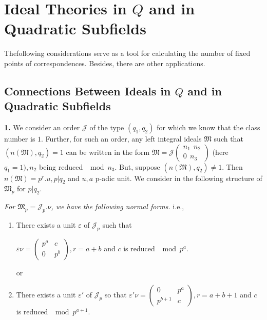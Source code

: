 \chapter{Ideal Theories in \texorpdfstring{$Q$}{Q} and in Quadratic Subfields}\label{chap4}%

The\pageoriginale following considerations serve as a tool for calculating the
number of fixed points of correspondences. Besides, there are other
applications. 
\setcounter{section}{8}
\section[Connections Between Ideals in...]{Connections Between Ideals in \texorpdfstring{$Q$}{Q} and in Quad\-ratic
  Subfields}\label{chap4:sec9}%

\textbf{1.} We consider an order $\mathcal{J}$ of the type $(q_1, q_2)$ for
which we know that the class number is $1$. Further, for such an
order, any left integral ideals $\mathfrak{M}$ such that
$(n(\mathfrak{M}), q_2) = 1$ can be written in the form $\mathfrak{M}
= \mathcal{J} \begin{pmatrix} n_1~ ~n_2 \\ 0 ~~ n_3 \end{pmatrix}$
(here $q_1 = 1), n_2$ being reduced $\mod n_3$. But, suppose
$(n(\mathfrak{M}), q_2) \neq 1$. Then $n (\mathfrak{M}) = p^r. u, p |
q_2$ and $u, a$ p-adic unit. We consider in the following structure of
$\mathfrak{M}_p$ for $p | q_2$. 

\setcounter{theorem}{0}
\begin{theorem}\label{chap4:sec9:thm1}%
  {\em For $\mathfrak{M}_p = \mathcal{J}_p.  \nu$, we have the
    following normal forms.} i.e., 
  \begin{enumerate}[\rm (1)]
  \item There exists a unit $\varepsilon$ of $\mathcal{J}_p$ such that 
    
    $\varepsilon  \nu = \begin{pmatrix} p^a & c \\ 0 &
    p^b \end{pmatrix}, r = a + b $ and $c$ is reduced $\mod p^a$. 
    
    or     
  \item There exists a unit $\varepsilon'$ of $\mathcal{J}_p$ so that
    $\varepsilon ' \nu = \begin{pmatrix} 0& p^a  \\  p^{b + 1}&
    c \end{pmatrix}, r = a + b  + 1$ and $c$ is reduced $\mod p^{a + 
    1}$. 
  \end{enumerate}
\end{theorem}

